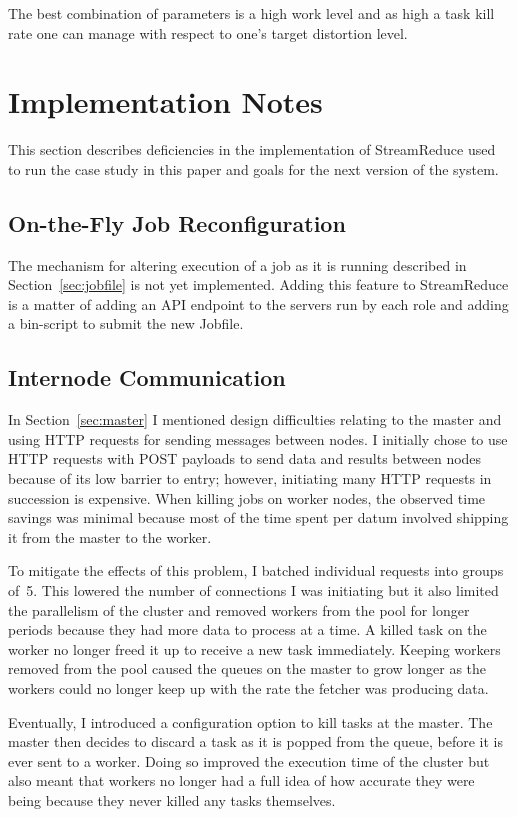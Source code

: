 \documentclass[12pt,twocolumn]{article}
\begin{document}
The best combination of parameters is a high work level and as high a task kill rate one can
manage with respect to one's target distortion level.


\section{Implementation Notes}
\label{sec:discussion}
This section describes deficiencies in the implementation of StreamReduce used to run the case study
in this paper and goals for the next version of the system.

\subsection{On-the-Fly Job Reconfiguration}
The mechanism for altering execution of a job as it is running described in Section~\ref{sec:jobfile}
is not yet implemented. Adding this feature to StreamReduce is a matter of adding an API endpoint
to the servers run by each role and adding a bin-script to submit the new Jobfile.

\subsection{Internode Communication}
In Section~\ref{sec:master} I mentioned design difficulties relating to the master and using HTTP
requests for sending messages between nodes. I initially chose to use HTTP requests with POST payloads
to send data and results between nodes because of its low barrier to entry; however, initiating many
HTTP requests in succession is expensive. When killing jobs on worker nodes, the observed time savings
was minimal because most of the time spent per datum involved shipping it from the master to the worker.

To mitigate the effects of this problem, I batched individual requests into groups of~5. This
lowered the number of connections I was initiating but it also limited the parallelism of the cluster
and removed workers from the pool for longer periods because they had more data to process at a time.
A killed task on the worker no longer freed it up to receive a new task immediately.
Keeping workers removed from the pool caused the queues on the master to grow longer as the workers
could no longer keep up with the rate the fetcher was producing data.

Eventually, I introduced a configuration option to kill tasks at the master. The master then
decides to discard a task as it is popped from the queue, before it is ever sent to a worker.
Doing so improved the execution time of the cluster but also meant that workers no longer had
a full idea of how accurate they were being because they never killed any tasks themselves.
\end{document}
